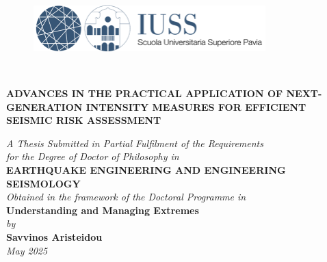 \documentclass[12pt,a4paper,twoside, openright]{report}
\makeatletter
\renewcommand{\cleardoublepage}{%
	\clearpage
	\ifodd\c@page\else
	\thispagestyle{empty}%
	\hbox{}%
	\newpage
	\fi
}
\makeatother
\begin{document}
	
	\begin{titlepage}
		\centering
		\begin{figure}[h!]
			\centering
			\includegraphics[width=0.8\textwidth]{figures/IUSS_logo.png}
		\end{figure}
		\\
		\vspace*{2cm}
		{\Large\bfseries ADVANCES IN THE PRACTICAL APPLICATION OF NEXT-GENERATION INTENSITY MEASURES FOR EFFICIENT SEISMIC RISK ASSESSMENT\par}
		\vspace{1cm}
		\textit{A Thesis Submitted in Partial Fulfilment of the Requirements\\
			for the Degree of Doctor of Philosophy in}\\[1cm]
		\textbf{EARTHQUAKE ENGINEERING AND ENGINEERING SEISMOLOGY}\\
		\vspace{1cm}
		\textit{Obtained in the framework of the Doctoral Programme in}\\[0.8cm]
		\textbf{Understanding and Managing Extremes}\\[1cm]
		\textit{by}\\[0.3cm]
		\textbf{Savvinos Aristeidou}\\
		\vfill
		\textit{May 2025}
	\end{titlepage}
	
	\cleardoublepage %
\end{document}
